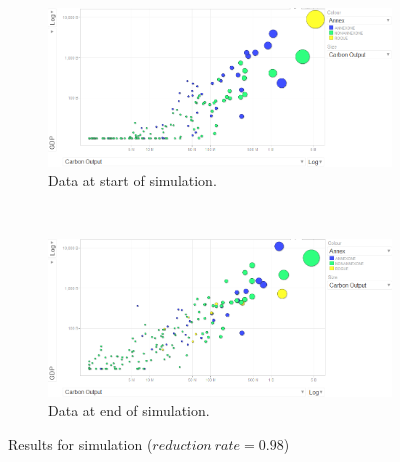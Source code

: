 \begin{figure}[H]
		\centering
        \begin{subfigure}[b]{\textwidth}
                \centering
                \includegraphics[width=\textwidth]{img/simulations/350-reduction-rate-before.png}
				\caption{Data at start of simulation.}
				\label{subfig:350-1}
        \end{subfigure}
        \\
        \begin{subfigure}[b]{\textwidth}
                \centering
                \includegraphics[width=\textwidth]{img/simulations/350-reduction-rate-after.png}
				\caption{Data at end of simulation.}
				\label{subfig:350-2}
        \end{subfigure}
        \caption{Results for simulation ($reduction~rate=0.98$)}\label{fig:350}
\end{figure}

